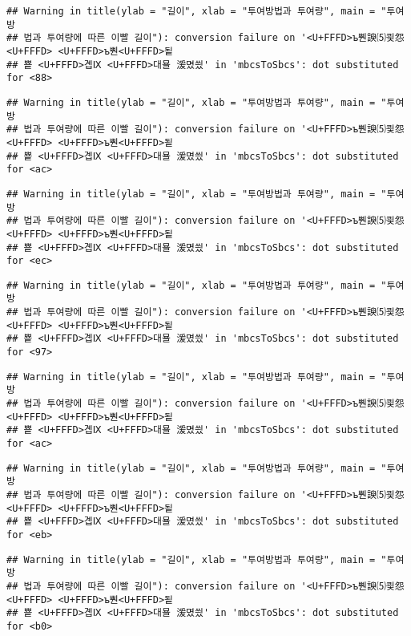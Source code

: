 \documentclass[]{article}
\begin{document}
\begin{verbatim}
## Warning in title(ylab = "길이", xlab = "투여방법과 투여량", main = "투여방
## 법과 투여량에 따른 이빨 길이"): conversion failure on '<U+FFFD>ъ뿬諛⑸쾿怨<U+FFFD> <U+FFFD>ъ뿬<U+FFFD>됱
## 뿉 <U+FFFD>곕Ⅸ <U+FFFD>대묠 湲몄씠' in 'mbcsToSbcs': dot substituted for <88>
\end{verbatim}

\begin{verbatim}
## Warning in title(ylab = "길이", xlab = "투여방법과 투여량", main = "투여방
## 법과 투여량에 따른 이빨 길이"): conversion failure on '<U+FFFD>ъ뿬諛⑸쾿怨<U+FFFD> <U+FFFD>ъ뿬<U+FFFD>됱
## 뿉 <U+FFFD>곕Ⅸ <U+FFFD>대묠 湲몄씠' in 'mbcsToSbcs': dot substituted for <ac>
\end{verbatim}

\begin{verbatim}
## Warning in title(ylab = "길이", xlab = "투여방법과 투여량", main = "투여방
## 법과 투여량에 따른 이빨 길이"): conversion failure on '<U+FFFD>ъ뿬諛⑸쾿怨<U+FFFD> <U+FFFD>ъ뿬<U+FFFD>됱
## 뿉 <U+FFFD>곕Ⅸ <U+FFFD>대묠 湲몄씠' in 'mbcsToSbcs': dot substituted for <ec>
\end{verbatim}

\begin{verbatim}
## Warning in title(ylab = "길이", xlab = "투여방법과 투여량", main = "투여방
## 법과 투여량에 따른 이빨 길이"): conversion failure on '<U+FFFD>ъ뿬諛⑸쾿怨<U+FFFD> <U+FFFD>ъ뿬<U+FFFD>됱
## 뿉 <U+FFFD>곕Ⅸ <U+FFFD>대묠 湲몄씠' in 'mbcsToSbcs': dot substituted for <97>
\end{verbatim}

\begin{verbatim}
## Warning in title(ylab = "길이", xlab = "투여방법과 투여량", main = "투여방
## 법과 투여량에 따른 이빨 길이"): conversion failure on '<U+FFFD>ъ뿬諛⑸쾿怨<U+FFFD> <U+FFFD>ъ뿬<U+FFFD>됱
## 뿉 <U+FFFD>곕Ⅸ <U+FFFD>대묠 湲몄씠' in 'mbcsToSbcs': dot substituted for <ac>
\end{verbatim}

\begin{verbatim}
## Warning in title(ylab = "길이", xlab = "투여방법과 투여량", main = "투여방
## 법과 투여량에 따른 이빨 길이"): conversion failure on '<U+FFFD>ъ뿬諛⑸쾿怨<U+FFFD> <U+FFFD>ъ뿬<U+FFFD>됱
## 뿉 <U+FFFD>곕Ⅸ <U+FFFD>대묠 湲몄씠' in 'mbcsToSbcs': dot substituted for <eb>
\end{verbatim}

\begin{verbatim}
## Warning in title(ylab = "길이", xlab = "투여방법과 투여량", main = "투여방
## 법과 투여량에 따른 이빨 길이"): conversion failure on '<U+FFFD>ъ뿬諛⑸쾿怨<U+FFFD> <U+FFFD>ъ뿬<U+FFFD>됱
## 뿉 <U+FFFD>곕Ⅸ <U+FFFD>대묠 湲몄씠' in 'mbcsToSbcs': dot substituted for <b0>
\end{verbatim}
\end{document}
